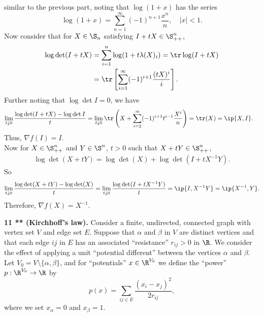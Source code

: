 \documentclass[../borwein-lewis_notes.tex]{subfiles}
\begin{document}
\begin{enumerate}[(a)]
{similar to the previous part, noting that $\log(1+x)$ has the series 
\begin{equation*}
\log(1+x) = \sum_{n=1}^\infty (-1)^{n+1} \frac{x^n}{n}, \quad 
|x|<1.
\end{equation*}
Now consider that for $X\in\S_n$ satisfying $I+tX\in\S_{++}^n$,
\begin{align*}
\log\det(I+tX) &= \sum_{i=1}^n \log(1+t\lambda(X)_i)
= \tr\log(I+tX) \\
&= \tr\left[\sum_{i=1}^\infty (-1)^{i+1}\frac{(tX)^i}{i}\right].
\end{align*}
Further noting that $\log\det I = 0$, we have 
\begin{align*}
\lim_{t\downarrow 0} \frac{\log\det(I+tX) - \log\det I}{t} 
&= \lim_{t\downarrow0} \tr\left(X + \sum_{i=2}^\infty (-1)^{i+1}t^{i-1}
\frac{X^i}{n}\right) = \tr(X) = \ip{X,I}.
\end{align*}
Thus, $\nabla f(I) = I$. \\
Now for $X\in\S_{++}^n$ and $Y\in\S^n$, $t>0$ such that $X+tY\in\S_{++}^n$,
\begin{align*}
\log\det(X+tY) = \log\det(X)+\log\det(I+tX^{-1}Y).
\end{align*}
So 
\begin{align*}
\lim_{t\downarrow 0}
 \frac{\log\det(X+tY)-\log\det(X)}{t} = \lim_{t\downarrow 0}
\frac{\log\det(I+tX^{-1}Y)}{t} = \ip{I, X^{-1}Y} = \ip{X^{-1}, Y}.
\end{align*}
Therefore, $\nabla f(X) = X^{-1}$.
}
\end{enumerate}
\noindent\textbf{11 ** (Kirchhoff's law).} Consider a finite, undirected,
connected graph with vertex set $V$ and edge set $E$. Suppose that 
$\alpha$ and $\beta$ in $V$ are distinct vertices and that each edge 
$ij$ in $E$ has an associated ``resistance'' $r_{ij}>0$ in $\R$. We 
consider the effect of applying a unit ``potential different'' between 
the vertices $\alpha$ and $\beta$. Let $V_0=V\setminus\{\alpha,\beta\}$,
and for ``potentials'' $x\in\R^{V_0}$ we define the ``power'' $p:\R^{V_0}
\to\R$ by 
\begin{equation*}
p(x) = \sum_{ij\in E} \frac{(x_i-x_j)^2}{2r_{ij}},
\end{equation*}
where we set $x_{\alpha}=0$ and $x_\beta=1$.
\end{document}

